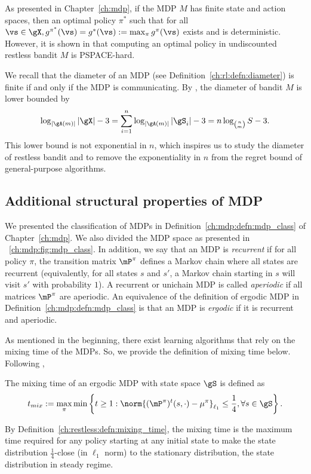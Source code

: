 As presented in Chapter~\ref{ch:mdp}, if the MDP $M$ has finite state and action spaces, then an optimal policy $\pi^*$ such that for all $\vs\in\gX, g^{\pi^*}(\vs)=g^*(\vs):=\max_{\pi}g^{\pi}(\vs)$ exists and is deterministic.
However, it is shown in \cite[Theorem~4]{papadimitriou1994complexity} that computing an optimal policy in undiscounted restless bandit $M$ is PSPACE-hard.

We recall that the diameter of an MDP (see Definition~\ref{ch:rl:defn:diameter}) is finite if and only if the MDP is communicating.
By \cite[Appendix A]{jaksch2010near}, the diameter of bandit $M$ is lower bounded by
\begin{equation*}
    \log_{|\gA(m)|}|\gX| -3 = \sum_{i=1}^{n}\log_{|\gA(m)|}|\gS_i| -3 =n\log_{{n \choose m}}S -3.
\end{equation*}
This lower bound is not exponential in $n$, which inspires us to study the diameter of restless bandit and to remove the exponentiality in $n$ from the regret bound of general-purpose algorithms.

\subsection{Additional structural properties of MDP}
\label{ssec:mdp_params}

We presented the classification of MDPs in Definition~\ref{ch:mdp:defn:mdp_class} of Chapter~\ref{ch:mdp}.
We also divided the MDP space as presented in \figurename~\ref{ch:mdp:fig:mdp_class}.
In addition, we say that an MDP is \emph{recurrent} if for all policy $\pi$, the transition matrix $\mP^\pi$ defines a Markov chain where all states are recurrent (equivalently, for all states $s$ and $s'$, a Markov chain starting in $s$ will visit $s'$ with probability $1$).
A recurrent or unichain MDP is called \emph{aperiodic} if all matrices $\mP^\pi$ are aperiodic.
An equivalence of the definition of ergodic MDP in Definition~\ref{ch:mdp:defn:mdp_class} is that an MDP is \emph{ergodic} if it is recurrent and aperiodic.

As mentioned in the beginning, there exist learning algorithms that rely on the mixing time of the MDPs.
So, we provide the definition of mixing time below.
Following \cite[Definition 5.1]{wei2020model},
\begin{defn}
    \label{ch:restless:defn:mixing_time}
    The mixing time of an ergodic MDP with state space $\gS$ is defined as
    \begin{align*}
        t_{mix} := \max_{\pi}\min\left\{ t\ge1 : \norm{(\mP^\pi)^t(s,\cdot) - \mu^\pi}_{\ell_1} \le \frac14, \forall s\in\gS\right\}.
    \end{align*}
\end{defn}
By Definition~\ref{ch:restless:defn:mixing_time}, the mixing time is the maximum time required for any policy starting at any initial state to make the state distribution $\frac14$-close (in $\ell_1$ norm) to the stationary distribution, the state distribution in steady regime.

